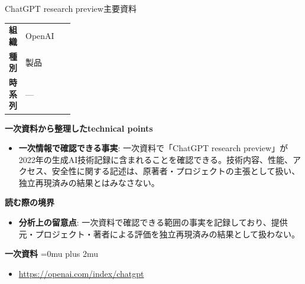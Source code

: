 \begin{technicalnote}{ChatGPT research preview}{主要資料}
\begingroup
\begin{tabularx}{\linewidth}{@{}>{\bfseries}p{0.22\linewidth}X@{}}
組織 & OpenAI \\
種別 & 製品 \\
時系列 & — \\
\end{tabularx}
\smallskip
{\bfseries 一次資料から整理したtechnical points}
\begin{itemize}[leftmargin=1.5em,itemsep=0.35em]
\item \textbf{一次情報で確認できる事実}: 一次資料で「ChatGPT research preview」が2022年の生成AI技術記録に含まれることを確認できる。技術内容、性能、アクセス、安全性に関する記述は、原著者・プロジェクトの主張として扱い、独立再現済みの結果とはみなさない。
\end{itemize}
\begin{minipage}{\linewidth}
{\bfseries 読む際の境界}
\begin{itemize}[leftmargin=1.5em,itemsep=0.35em]
\item \textbf{分析上の留意点}: 一次資料で確認できる範囲の事実を記録しており、提供元・プロジェクト・著者による評価を独立再現済みの結果として扱わない。
\end{itemize}
\begin{samepage}
{\bfseries 一次資料}
\begingroup\sloppy
\Urlmuskip=0mu plus 2mu\relax
\begin{itemize}[leftmargin=1.5em,itemsep=0.25em]
\item {\scriptsize\url{https://openai.com/index/chatgpt}}
\end{itemize}
\endgroup
\end{samepage}
\end{minipage}
\endgroup
\end{technicalnote}
\medskip

